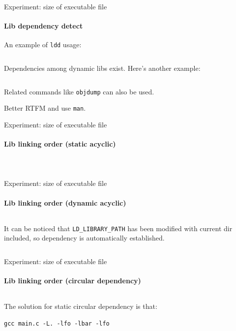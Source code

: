 \begin{frame}[fragile]{Experiment: size of executable file}
    \framesubtitle{Lib dependency detect}

    An example of \texttt{ldd} usage:

    \inputminted[fontsize=\tiny]{shell-session}{code/week7/ldd_example.txt}

    Dependencies among dynamic libs exist. Here's another example:

    \inputminted[fontsize=\tiny]{shell-session}{code/week7/readelf_example.txt}

    Related commands like \texttt{objdump} can also be used.

    Better RTFM and use \texttt{man}.

\end{frame}

\begin{frame}{Experiment: size of executable file}
    \framesubtitle{Lib linking order (static acyclic)}
    \begin{columns}
        \inputminted[fontsize=\tiny]{shell-session}{code/week7/static_acyclic.txt}
        \inputminted[fontsize=\small]{shell-session}{code/week7/static_acyclic_dep.txt}
    \end{columns}
\end{frame}

\begin{frame}{Experiment: size of executable file}
    \framesubtitle{Lib linking order (dynamic acyclic)}
    \inputminted[fontsize=\tiny]{shell-session}{code/week7/dynamic_acyclic.txt}

    It can be noticed that \texttt{LD\_LIBRARY\_PATH} has been modified with
    current dir included, so dependency is automatically established.

    \inputminted[fontsize=\small]{shell-session}{code/week7/dynamic_acyclic_dep.txt}

\end{frame}

\begin{frame}{Experiment: size of executable file}
    \framesubtitle{Lib linking order (circular dependency)}
    \inputminted[fontsize=\small]{shell-session}{code/week7/circular.txt}
    The solution for static circular dependency is that:

    \texttt{gcc main.c -L. -lfo -lbar -lfo}
\end{frame}

